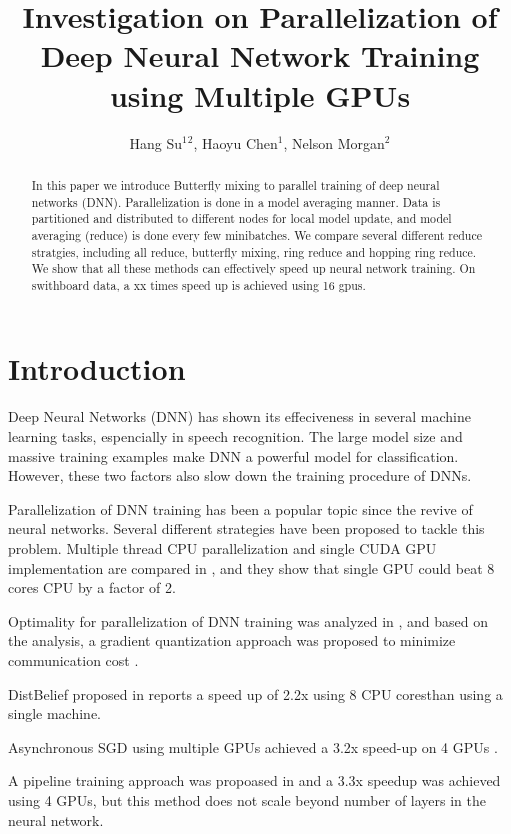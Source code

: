 \documentclass{article}
\title{Investigation on Parallelization of Deep Neural Network Training using Multiple GPUs}
\author{Hang Su$^1$$^2$, Haoyu Chen$^1$, Nelson Morgan$^2$}
\date{}
\begin{document}
%
\maketitle
%
\begin{abstract}
In this paper we introduce Butterfly mixing to parallel training of deep neural networks (DNN). Parallelization is done
in a model averaging manner. Data is partitioned and distributed to different nodes for local model update, and
model averaging (reduce) is done every few minibatches. We compare several different reduce stratgies, including
all reduce, butterfly mixing, ring reduce and hopping ring reduce. We show that all these methods can effectively
speed up neural network training. On swithboard data, a xx times speed up is achieved using 16 gpus.

\end{abstract}
%
%
\section{Introduction}
\label{sec:intro}
Deep Neural Networks (DNN) has shown its effeciveness in several machine learning tasks, espencially in speech
recognition. The large model size and massive training examples make DNN a powerful model for classification. However,
these two factors also slow down the training procedure of DNNs.

Parallelization of DNN training has been a popular topic since the revive of neural networks. Several different strategies
have been proposed to tackle this problem. Multiple thread CPU parallelization and single CUDA GPU implementation are compared
in \cite{scanzio2010parallel,vesely2010parallel}, and they show that single GPU could beat 8 cores CPU by a factor of 2.

Optimality for parallelization of DNN training was analyzed in \cite{seide2014parallelizability}, and based on the analysis, 
a gradient quantization approach was proposed to minimize communication cost \cite{seide20141}.

DistBelief proposed in \cite{dean2012large} reports a speed up of 2.2x using 8 CPU coresthan using a
single machine.


Asynchronous SGD using multiple GPUs achieved a 3.2x speed-up on 4 GPUs \cite{zhang2013asynchronous}.

A pipeline training approach was propoased in \cite{chen2012pipelined} and a 3.3x speedup was achieved using 4 GPUs, but this
method does not scale beyond number of layers in the neural network.
\end{document}
